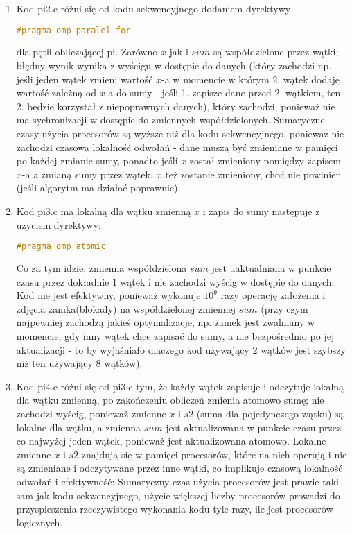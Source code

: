 \documentclass[12pt]{article}
\begin{document}
\begin{enumerate}
	\item Kod pi2.c różni się od kodu sekwencyjnego dodaniem dyrektywy 
	\begin{lstlisting}[language=C]
		#pragma omp paralel for
	\end{lstlisting}
	dla pętli obliczającej pi. Zarówno $x$ jak i $sum$ są współdzielone przez wątki; błędny wynik wynika z wyścigu w dostępie do danych (który zachodzi np. jeśli jeden wątek zmieni wartość $x$-a w momencie w którym 2. wątek dodaję wartość zależną od $x$-a do sumy - jeśli 1. zapisze dane przed 2. wątkiem, ten 2. będzie korzystał z niepoprawnych danych), który zachodzi, ponieważ nie ma sychronizacji w dostępie do zmiennych współdzielonych. Sumaryczne czasy użycia procesorów są wyższe niż dla kodu sekwencyjnego, ponieważ nie zachodzi czasowa lokalność odwołań - dane muszą być zmieniane w pamięci po każdej zmianie sumy, ponadto jeśli $x$ został zmieniony pomiędzy zapisem $x$-a a zmianą sumy przez wątek, $x$ też zostanie zmieniony, choć nie powinien (jeśli algorytm ma działać poprawnie).
	\\
	
	
	\item Kod pi3.c ma lokalną dla wątku zmienną $x$ i zapis do sumy następuje z użyciem dyrektywy:
	\begin{lstlisting}[language=C]
		#pragma omp atomic
	\end{lstlisting}
		Co za tym idzie, zmienna współdzielona $sum$ jest uaktualniana w punkcie czasu przez dokładnie 1 wątek i nie zachodzi wyścig w dostępie do danych. Kod nie jest efektywny, ponieważ wykonuje $10^{9}$ razy operację założenia i zdjęcia zamka(blokady) na współdzielonej zmiennej $sum$ (przy czym najpewniej zachodzą jakieś optymalizacje, np. zamek jest zwalniany w momencie, gdy inny wątek chce zapisać do sumy, a nie bezpośrednio po jej aktualizacji - to by wyjaśniało dlaczego kod używający 2 wątków jest szybszy niż ten używający 8 wątków).\\
	
	\item Kod pi4.c różni się od pi3.c tym, że każdy wątek zapisuje i odczytuje lokalną dla wątku zmienną, po zakończeniu obliczeń zmienia atomowo sumę; nie zachodzi wyścig, ponieważ zmienne $x$ i $s2$ (suma dla pojedynczego wątku) są lokalne dla wątku, a zmienna $sum$ jest aktualizowana w punkcie czasu przez co najwyżej jeden wątek, ponieważ jest aktualizowana atomowo. Lokalne zmienne $x$ i $s2$ znajdują się w pamięci procesorów, które na nich operują i nie są zmieniane i odczytywane przez inne wątki, co implikuje czasową lokalność odwołań i efektywność: Sumaryczny czas użycia procesorów jest prawie taki sam jak kodu sekwencyjnego, użycie większej liczby procesorów prowadzi do przyspieszenia rzeczywistego wykonania kodu tyle razy, ile jest procesorów logicznych.\\
	

\end{enumerate}
\end{document}
